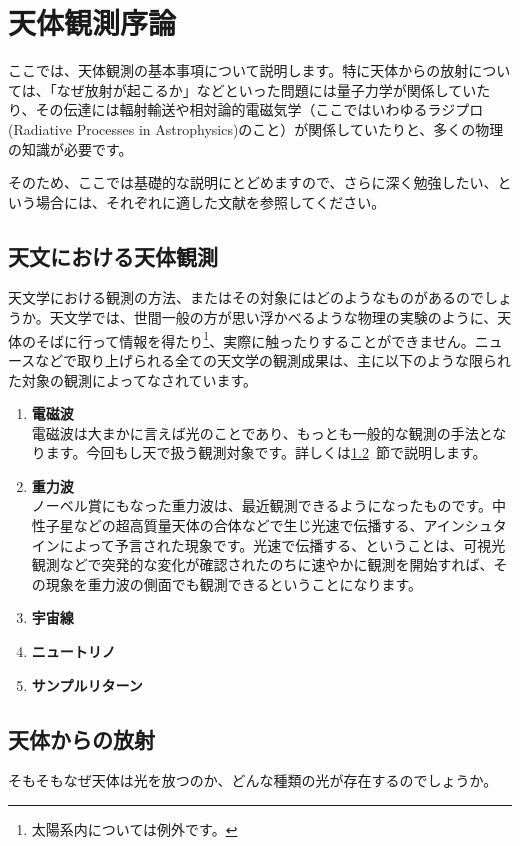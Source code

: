\chapter{天体観測序論}
\label{chap_2}
ここでは、天体観測の基本事項について説明します。特に天体からの放射については、「なぜ放射が起こるか」などといった問題には量子力学が関係していたり、その伝達には輻射輸送や相対論的電磁気学（ここではいわゆるラジプロ(Radiative Processes in Astrophysics)のこと）が関係していたりと、多くの物理の知識が必要です。

そのため、ここでは基礎的な説明にとどめますので、さらに深く勉強したい、という場合には、それぞれに適した文献を参照してください。

\section{天文における天体観測}
\label{sec_2_1}
天文学における観測の方法、またはその対象にはどのようなものがあるのでしょうか。天文学では、世間一般の方が思い浮かべるような物理の実験のように、天体のそばに行って情報を得たり\footnote{太陽系内については例外です。}、実際に触ったりすることができません。ニュースなどで取り上げられる全ての天文学の観測成果は、主に以下のような限られた対象の観測によってなされています。

\begin{enumerate}[1.]
    \item \textbf{電磁波}\\
    電磁波は大まかに言えば光のことであり、もっとも一般的な観測の手法となります。今回もし天で扱う観測対象です。詳しくは\ref{sec_2_2}~節で説明します。
    \item \textbf{重力波}\\
    ノーベル賞にもなった重力波は、最近観測できるようになったものです。中性子星などの超高質量天体の合体などで生じ光速で伝播する、アインシュタインによって予言された現象です。光速で伝播する、ということは、可視光観測などで突発的な変化が確認されたのちに速やかに観測を開始すれば、その現象を重力波の側面でも観測できるということになります。
    \item \textbf{宇宙線}\\
    \item \textbf{ニュートリノ}\\
    \item \textbf{サンプルリターン}\\
\end{enumerate}

\section{天体からの放射}
\label{sec_2_2}
そもそもなぜ天体は光を放つのか、どんな種類の光が存在するのでしょうか。

